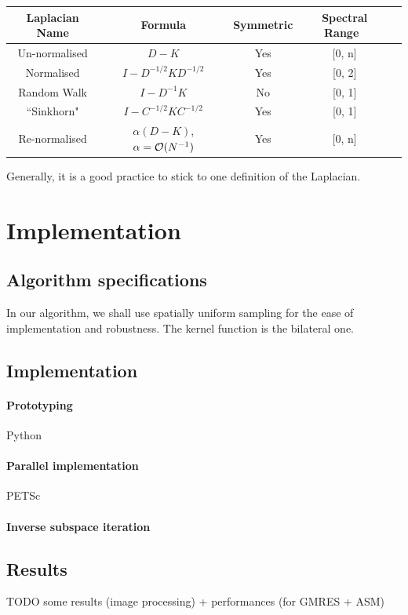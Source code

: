 \begin{table}[!htbp]
 \centering
 \begin{tabular}{|c|c|c|c|c|}
  \hline
  Laplacian Name & Formula & Symmetric & Spectral Range \\
  \hline
  Un-normalised & \(D - K\) & Yes & [0, n] \\
  \hline
  Normalised & \(I - D^{-1/2}KD^{-1/2}\) & Yes & [0, 2] \\
  \hline
  Random Walk & \(I - D^{-1}K\) & No & [0, 1] \\
  \hline
  ``Sinkhorn" \cite{milanfar_symmetrizing_2013} & \(I - C^{-1/2}KC^{-1/2}\) & Yes & [0, 1] \\
  \hline
  Re-normalised \cite{milanfar_new_2016} & \(\alpha(D - K)\), \(\alpha = \operatorname{\mathcal{O}}(N^{-1})\) & Yes & [0, n] \\
  \hline
 \end{tabular}
\end{table}
Generally, it is a good practice to stick to one definition of the Laplacian.

\section{Implementation}

\subsection{Algorithm specifications}
In our algorithm, we shall use spatially uniform sampling for the ease of implementation and robustness.
The kernel function is the bilateral one.

\subsection{Implementation}

\paragraph{Prototyping}
Python

\paragraph{Parallel implementation}
PETSc

\paragraph{Inverse subspace iteration}

\subsection{Results}
TODO some results (image processing) + performances (for GMRES + ASM)
